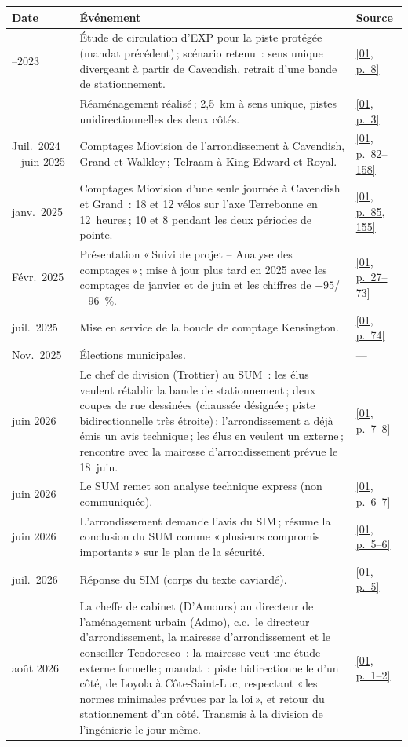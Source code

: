 \documentclass[11pt,letterpaper]{article}
\newcommand{\pagesurl}{https://openmobilitydata.github.io/Terrebonne-access-requests}
\newcommand{\pgl}[3]{\href{\pagesurl/\csname bundle#1\endcsname\#page=#2}{\textsf{\small[#1, p.~#3]}}}
\newcommand{\pg}[2]{\pgl{#1}{#2}{#2}}
\begin{document}
\begin{small}
\begin{longtable}{>{\raggedright\arraybackslash}p{2.6cm}>{\raggedright\arraybackslash}p{10.2cm}>{\raggedright\arraybackslash}p{2.0cm}}
\toprule
Date & Événement & Source \\
\midrule
\endhead
2022--2023 & Étude de circulation d'EXP pour la piste protégée (mandat précédent)\,; scénario retenu~: sens unique divergeant à partir de Cavendish, retrait d'une bande de stationnement. & \pg{01}{8} \\
2024 & Réaménagement réalisé\,; 2,5~km à sens unique, pistes unidirectionnelles des deux côtés. & \pg{01}{3} \\
Juil.\ 2024 -- juin 2025 & Comptages Miovision de l'arrondissement à Cavendish, Grand et Walkley\,; Telraam à King-Edward et Royal. & \pgl{01}{82}{82--158} \\
29 janv.\ 2025 & Comptages Miovision d'une seule journée à Cavendish et Grand~: 18 et 12 vélos sur l'axe Terrebonne en 12~heures\,; 10 et 8 pendant les deux périodes de pointe. & \pgl{01}{85}{85, 155} \\
Févr.\ 2025 & Présentation «\,Suivi de projet -- Analyse des comptages\,»\,; mise à jour plus tard en 2025 avec les comptages de janvier et de juin et les chiffres de $-95$/$-96$~\%. & \pgl{01}{27}{27--73} \\
26 juil.\ 2025 & Mise en service de la boucle de comptage Kensington. & \pg{01}{74} \\
Nov.\ 2025 & Élections municipales. & --- \\
10 juin 2026 & Le chef de division (Trottier) au SUM~: les élus veulent rétablir la bande de stationnement\,; deux coupes de rue dessinées (chaussée désignée\,; piste bidirectionnelle très étroite)\,; l'arrondissement a déjà émis un avis technique\,; les élus en veulent un externe\,; rencontre avec la mairesse d'arrondissement prévue le 18~juin. & \pgl{01}{7}{7--8} \\
17 juin 2026 & Le SUM remet son analyse technique express (non communiquée). & \pgl{01}{6}{6--7} \\
22 juin 2026 & L'arrondissement demande l'avis du SIM\,; résume la conclusion du SUM comme «\,plusieurs compromis importants\,» sur le plan de la sécurité. & \pgl{01}{5}{5--6} \\
13 juil.\ 2026 & Réponse du SIM (corps du texte caviardé). & \pg{01}{5} \\
13 août 2026 & La cheffe de cabinet (D'Amours) au directeur de l'aménagement urbain (Admo), c.c.\ le directeur d'arrondissement, la mairesse d'arrondissement et le conseiller Teodoresco~: la mairesse veut une étude externe formelle\,; mandat~: piste bidirectionnelle d'un côté, de Loyola à Côte-Saint-Luc, respectant «\,les normes minimales prévues par la loi\,», et retour du stationnement d'un côté. Transmis à la division de l'ingénierie le jour même. & \pgl{01}{1}{1--2} \\

\end{longtable}
\end{small}
\end{document}
